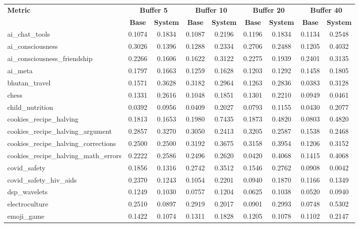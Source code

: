 \documentclass[pdflatex,sn-mathphys-num]{sn-jnl}%
\theoremstyle{thmstyleone}%
\theoremstyle{thmstyletwo}%
\theoremstyle{thmstylethree}%
\begin{document}
\begin{appendices}
\begin{landscape}
\begin{longtable}{@{}p{3.8cm}cccccccc@{}}
\toprule
\textbf{Metric} & \multicolumn{2}{c}{\textbf{Buffer 5}} & \multicolumn{2}{c}{\textbf{Buffer 10}} & \multicolumn{2}{c}{\textbf{Buffer 20}} & \multicolumn{2}{c}{\textbf{Buffer 40}} \\
\cmidrule(lr){2-3}\cmidrule(lr){4-5}\cmidrule(lr){6-7}\cmidrule(lr){8-9}
 & \textbf{Base} & \textbf{System} & \textbf{Base} & \textbf{System} & \textbf{Base} & \textbf{System} & \textbf{Base} & \textbf{System} \\
\midrule
\endhead
ai\_chat\_tools & 0.1074 & 0.1834 & 0.1087 & 0.2196 & 0.1196 & 0.1834 & 0.1134 & 0.2548 \\
ai\_consciousness & 0.3026 & 0.1396 & 0.1288 & 0.2334 & 0.2706 & 0.2488 & 0.1205 & 0.4032 \\
ai\_consciousness\_friendship & 0.2266 & 0.1606 & 0.1622 & 0.3122 & 0.2275 & 0.1939 & 0.2401 & 0.3135 \\
ai\_meta & 0.1797 & 0.1663 & 0.1259 & 0.1628 & 0.1203 & 0.1292 & 0.1458 & 0.1805 \\
bhutan\_travel & 0.1571 & 0.3628 & 0.3182 & 0.2964 & 0.1263 & 0.2836 & 0.0383 & 0.3128 \\
chess & 0.1331 & 0.2616 & 0.1048 & 0.1851 & 0.1301 & 0.2210 & 0.0949 & 0.0461 \\
child\_nutrition & 0.0392 & 0.0956 & 0.0409 & 0.2027 & 0.0793 & 0.1155 & 0.0430 & 0.2077 \\
cookies\_recipe\_halving & 0.1813 & 0.1653 & 0.1980 & 0.7435 & 0.1873 & 0.4820 & 0.0803 & 0.4820 \\
cookies\_recipe\_halving\_argument & 0.2857 & 0.3270 & 0.3050 & 0.2413 & 0.3205 & 0.2587 & 0.1538 & 0.2468 \\
cookies\_recipe\_halving\_corrections & 0.2500 & 0.2500 & 0.3192 & 0.3675 & 0.3158 & 0.3954 & 0.1206 & 0.3152 \\
cookies\_recipe\_halving\_math\_errors & 0.2222 & 0.2586 & 0.2496 & 0.2620 & 0.0420 & 0.4068 & 0.1415 & 0.4068 \\
covid\_safety & 0.1856 & 0.1316 & 0.2742 & 0.3512 & 0.1546 & 0.2762 & 0.0908 & 0.0042 \\
covid\_safety\_hiv\_aids & 0.2370 & 0.1243 & 0.1054 & 0.2201 & 0.0940 & 0.1870 & 0.1166 & 0.1349 \\
dsp\_wavelets & 0.1249 & 0.1030 & 0.0757 & 0.1204 & 0.0625 & 0.1038 & 0.0520 & 0.0940 \\
electroculture & 0.2510 & 0.0897 & 0.2919 & 0.2017 & 0.0901 & 0.2993 & 0.0748 & 0.5302 \\
emoji\_game & 0.1422 & 0.1074 & 0.1311 & 0.1828 & 0.1205 & 0.1078 & 0.1102 & 0.2147 \\

\end{longtable}
\end{landscape}
\end{appendices}
\end{document}
